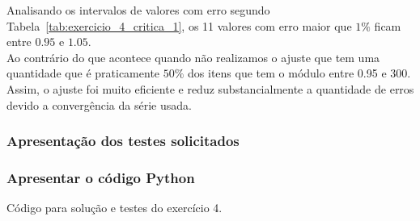 Analisando os intervalos de valores com erro segundo Tabela~\ref{tab:exercicio_4_critica_1}, os 11 valores com erro maior que $1 \%$ ficam entre $0.95$ e $1.05$.\\
Ao contrário do que acontece quando não realizamos o ajuste que tem uma quantidade que é praticamente $50 \%$ dos itens que tem o módulo entre 0.95 e 300.\\
Assim, o ajuste foi muito eficiente e reduz substancialmente a quantidade de erros devido a convergência da série usada.

\subsubsection{Apresentação dos testes solicitados}
    

\subsubsection{Apresentar o código Python}
    
    Código para solução e testes do exercício 4.

